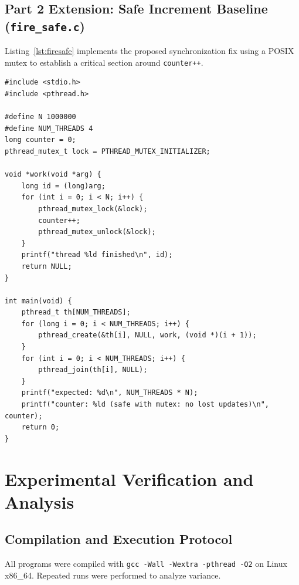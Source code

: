 \documentclass[12pt,a4paper]{article}
\begin{document}
\subsection{Part 2 Extension: Safe Increment Baseline (\texttt{fire\_safe.c})}
Listing~\ref{lst:firesafe} implements the proposed synchronization fix using a POSIX mutex to establish a critical section around \texttt{counter++}.

\begin{lstlisting}[style=cstyle, caption={Synchronized Counter using POSIX Mutex (\texttt{fire\_safe.c})}, label={lst:firesafe}]
#include <stdio.h>
#include <pthread.h>

#define N 1000000
#define NUM_THREADS 4
long counter = 0;
pthread_mutex_t lock = PTHREAD_MUTEX_INITIALIZER;

void *work(void *arg) {
    long id = (long)arg;
    for (int i = 0; i < N; i++) {
        pthread_mutex_lock(&lock);
        counter++;
        pthread_mutex_unlock(&lock);
    }
    printf("thread %ld finished\n", id);
    return NULL;
}

int main(void) {
    pthread_t th[NUM_THREADS];
    for (long i = 0; i < NUM_THREADS; i++) {
        pthread_create(&th[i], NULL, work, (void *)(i + 1));
    }
    for (int i = 0; i < NUM_THREADS; i++) {
        pthread_join(th[i], NULL);
    }
    printf("expected: %d\n", NUM_THREADS * N);
    printf("counter: %ld (safe with mutex: no lost updates)\n", counter);
    return 0;
}
\end{lstlisting}

\section{Experimental Verification and Analysis}

\subsection{Compilation and Execution Protocol}
All programs were compiled with \texttt{gcc -Wall -Wextra -pthread -O2} on Linux x86\_64. Repeated runs were performed to analyze variance.
\end{document}

